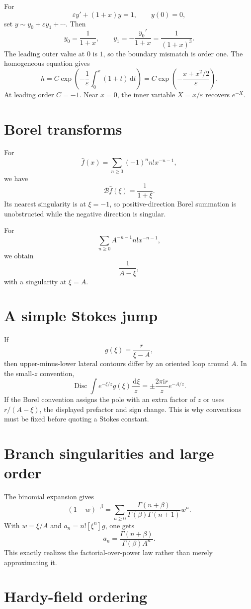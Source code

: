 \documentclass[11pt,openany]{book}
\theoremstyle{definition}
\theoremstyle{plain}
\theoremstyle{remark}
\newcommand{\eps}{\varepsilon}
\newcommand{\dd}{\,\mathrm{d}}
\newcommand{\ii}{\mathrm{i}}
\newcommand{\asym}{\sim}
\newcommand{\trans}[1]{\widehat{#1}}
\newcommand{\Borel}{\mathcal{B}}
\begin{document}
For
\[
 \eps y'+(1+x)y=1,
 \qquad y(0)=0,
\]
set $y\asym y_0+\eps y_1+\cdots$. Then
\[
 y_0=\frac1{1+x},
 \qquad
 y_1=-\frac{y_0'}{1+x}=\frac1{(1+x)^3}.
\]
The leading outer value at $0$ is $1$, so the boundary mismatch is order one. The homogeneous equation gives
\[
 h=C\exp\left(-\frac1\eps\int_0^x(1+t)\dd t\right)
 =C\exp\left(-\frac{x+x^2/2}{\eps}\right).
\]
At leading order $C=-1$. Near $x=0$, the inner variable $X=x/\eps$ recovers $e^{-X}$.

\section{Borel transforms}

For
\[
 \trans f(x)=\sum_{n\ge0}(-1)^nn!x^{-n-1},
\]
we have
\[
 \Borel\trans f(\xi)=\frac1{1+\xi}.
\]
Its nearest singularity is at $\xi=-1$, so positive-direction Borel summation is unobstructed while the negative direction is singular.

For
\[
 \sum_{n\ge0}A^{-n-1}n!x^{-n-1},
\]
we obtain
\[
 \frac1{A-\xi},
\]
with a singularity at $\xi=A$.

\section{A simple Stokes jump}

If
\[
 g(\xi)=\frac{r}{\xi-A},
\]
then upper-minus-lower lateral contours differ by an oriented loop around $A$. In the small-$z$ convention,
\[
 \operatorname{Disc}\int e^{-\xi/z}g(\xi)\frac{\dd\xi}{z}
 =\pm\frac{2\pi\ii r}{z}e^{-A/z}.
\]
If the Borel convention assigns the pole with an extra factor of $z$ or uses $r/(A-\xi)$, the displayed prefactor and sign change. This is why conventions must be fixed before quoting a Stokes constant.

\section{Branch singularities and large order}

The binomial expansion gives
\[
 (1-w)^{-\beta}
 =\sum_{n\ge0}
 \frac{\Gamma(n+\beta)}{\Gamma(\beta)\Gamma(n+1)}w^n.
\]
With $w=\xi/A$ and $a_n=n![\xi^n]g$, one gets
\[
 a_n=\frac{\Gamma(n+\beta)}{\Gamma(\beta)A^n}.
\]
This exactly realizes the factorial-over-power law rather than merely approximating it.

\section{Hardy-field ordering}
\end{document}
